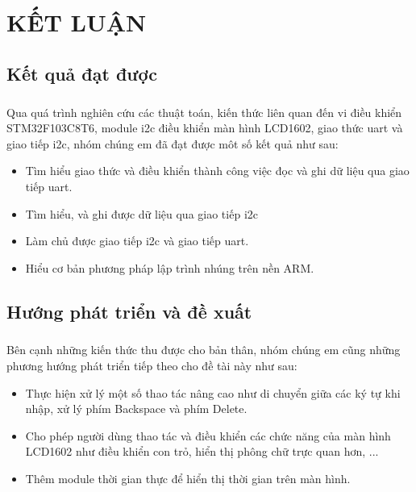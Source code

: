 \chapter{KẾT LUẬN}
\section{Kết quả đạt được}
\paragraph{}
Qua quá trình nghiên cứu các thuật toán, kiến thức liên quan đến vi điều khiển STM32F103C8T6, module \acrshort{i2c} điều khiển màn hình LCD1602, giao thức \acrshort{uart} và giao tiếp \acrshort{i2c}, nhóm chúng em đã đạt được môt số kết quả như sau:
\begin{itemize}
	\item Tìm hiểu giao thức và điều khiển thành công việc đọc và ghi dữ liệu qua giao tiếp \acrshort{uart}.
	\item Tìm hiểu, và ghi được dữ liệu qua giao tiếp \acrshort{i2c}
	\item Làm chủ được giao tiếp \acrshort{i2c} và giao tiếp \acrshort{uart}.
	\item Hiểu cơ bản phương pháp lập trình nhúng trên nền ARM.
\end{itemize}
\section{Hướng phát triển và đề xuất}
\paragraph{}
Bên cạnh những kiến thức thu được cho bản thân, nhóm chúng em cũng những phương hướng phát triển tiếp theo cho đề tài này như sau:
\begin{itemize}
	\item Thực hiện xử lý một số thao tác nâng cao như di chuyển giữa các ký tự khi nhập, xử lý phím Backspace và phím Delete.
	\item Cho phép người dùng thao tác và điều khiển các chức năng của màn hình LCD1602 như điều khiển con trỏ, hiển thị phông chữ trực quan hơn, ...
	\item Thêm module thời gian thực để hiển thị thời gian trên màn hình.
\end{itemize}

